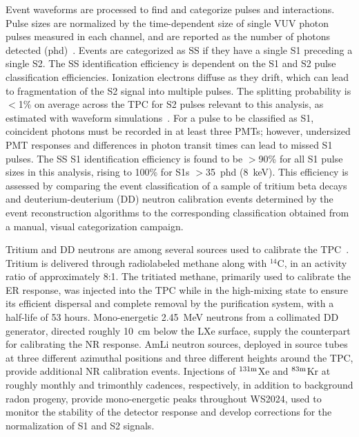 \documentclass[%
 reprint,
 superscriptaddress,
 amsmath,amssymb,
 prl,
floatfix,
]{revtex4-2}
\newcommand{\RevA}[1]{{\color{black}#1}}
\begin{document}
Event waveforms are processed to find and categorize pulses and interactions. Pulse sizes are normalized by the time-dependent size of single VUV photon pulses measured in each channel, and are reported as the number of photons detected (phd)~\cite{faham2015measurements, LOPEZPAREDESdpe}. Events are categorized as SS if they have a single S1 preceding a single S2. The SS identification efficiency is dependent on the S1 and S2 pulse classification efficiencies. Ionization electrons diffuse as they drift, which can lead to fragmentation of the S2 signal into multiple pulses. The splitting probability is $<$1\% on average across the TPC for S2 pulses relevant to this analysis, as estimated with waveform simulations~\cite{LZSims}. For a pulse to be classified as S1, coincident photons must be recorded in at least three PMTs; however, undersized PMT responses and differences in photon transit times can lead to missed S1 pulses. The SS S1 identification efficiency is found to be $>$90\% for all S1 pulse sizes in this analysis, rising to 100\% for S1s $>$35~phd (8~keV). This efficiency is assessed by comparing the event classification of a sample of tritium beta decays and deuterium-deuterium (DD) neutron calibration events determined by the event reconstruction algorithms to the corresponding classification obtained from a manual, visual categorization campaign.

Tritium and DD neutrons are among several sources used to calibrate the TPC~\cite{LZ_calibrations}. Tritium is delivered through radiolabeled methane along with $^{14}$C, in an activity ratio of approximately 8:1. The tritiated methane, primarily used to calibrate the ER response, was injected into the TPC while in the high-mixing state to ensure its efficient dispersal and complete removal \RevA{by the purification system, with a half-life of 53 hours}. Mono-energetic 2.45~MeV neutrons from a collimated DD generator, directed roughly 10~cm below the LXe surface, supply the counterpart for calibrating the NR response. AmLi neutron sources, deployed in source tubes at three different azimuthal positions and three different heights around the TPC, provide additional NR calibration events. Injections of $^{131{\rm m}}$Xe and $^{83{\rm m}}$Kr at roughly monthly and trimonthly cadences, respectively, in addition to background radon progeny, provide mono-energetic peaks throughout WS2024, used to monitor the stability of the detector response and develop corrections for the normalization of S1 and S2 signals.
\end{document}
